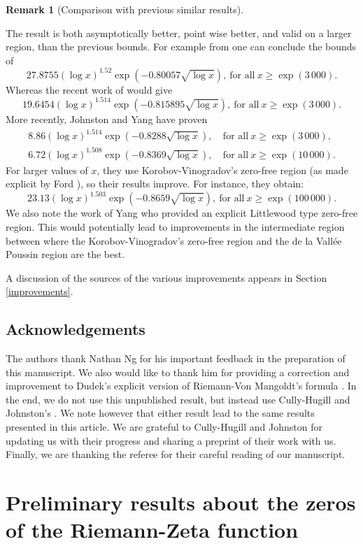 \documentclass[10pt]{amsart}
\theoremstyle{definition}
\newtheorem{Rem}[prop]{Remark}
\numberwithin{equation}{section}
\begin{document}
\begin{Rem}[Comparison with previous similar results]
\begin{enumerate}
The result is both asymptotically better, point wise better, and valid on a larger region, than the previous bounds. 
For example from \cite{PlaTru21ET} one can conclude the bounds of
\[  27.8755(\log x)^{1.52} \exp(-0.80057\sqrt{\log x}),\ \text{for all}\   x \ge \exp(3\,000).\]
Whereas the recent work of \cite{CulJoh21} would give 
\[ 19.6454  (\log x)^{1.514} \exp(-0.815895\sqrt{\log x}),\ \text{for all}\  x \ge \exp(3\,000).\]
More recently, Johnston and Yang \cite{JohYan22} have proven
\begin{align*}
8.86  (\log x)^{1.514} \exp(- 0.8288\sqrt{\log x}),&\ \text{for all}\  x \ge \exp(3\,000), \\
6.72  (\log x)^{1.508} \exp(- 0.8369\sqrt{\log x}),&\ \text{for all}\  x \ge \exp(10\, 000).
\end{align*}
For larger values of $x$, they use Korobov-Vinogradov's zero-free region (as made explicit by Ford \cite{For01}), so their results improve. For instance, they obtain:
\[
23.13 (\log x)^{1.503} \exp(- 0.8659\sqrt{\log x}), \ \text{for all}\  x \ge \exp(100\, 000).
\]
We also note the work \cite{Ya23} of Yang who provided an explicit Littlewood type zero-free region. This would potentially lead to improvements in the intermediate region between where the Korobov-Vinogradov's zero-free region and the de la Vall\'ee Poussin region are the best.
 \end{enumerate}
 \end{Rem}
 
 A discussion of the sources of the various improvements appears in Section \ref{improvements}.

%
\subsection{Acknowledgements}
%
The authors thank Nathan Ng for his important feedback in the preparation of this manuscript.
We also would like to thank him for providing a correction and improvement to Dudek's explicit version of Riemann-Von Mangoldt's formula \cite[Thm 1.3.]{Dud16}. In the end, we do not use this  unpublished result, but instead use Cully-Hugill and Johnston's \cite[Thm 1.2.]{CulJoh21}. We note however that either result lead to the same results presented in this article. We are grateful to Cully-Hugill and Johnston for updating us with their progress and sharing a preprint of their work with us.
Finally, we are thanking the referee for their careful reading of our manuscript.

\section{Preliminary results about the zeros of the Riemann-Zeta function}\label{section-zeros}
\end{document}
